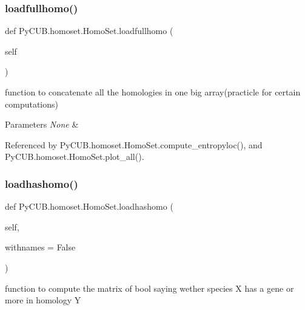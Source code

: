 \mbox{\label{class_py_c_u_b_1_1homoset_1_1_homo_set_a5029dbdf4e7f61bd38b6273f4fde9ead}} 
\subsubsection{\texorpdfstring{loadfullhomo()}{loadfullhomo()}}
{\footnotesize\ttfamily def Py\+C\+U\+B.\+homoset.\+Homo\+Set.\+loadfullhomo (\begin{DoxyParamCaption}\item[{}]{self }\end{DoxyParamCaption})}



function to concatenate all the homologies in one big array(practicle for certain computations) 


\begin{DoxyParams}{Parameters}
{\em None} & \\
\hline
\end{DoxyParams}


Referenced by Py\+C\+U\+B.\+homoset.\+Homo\+Set.\+compute\+\_\+entropyloc(), and Py\+C\+U\+B.\+homoset.\+Homo\+Set.\+plot\+\_\+all().

\mbox{\label{class_py_c_u_b_1_1homoset_1_1_homo_set_a5a56a99b5bf87afb418a1bbc5ec1c10b}} 
\subsubsection{\texorpdfstring{loadhashomo()}{loadhashomo()}}
{\footnotesize\ttfamily def Py\+C\+U\+B.\+homoset.\+Homo\+Set.\+loadhashomo (\begin{DoxyParamCaption}\item[{}]{self,  }\item[{}]{withnames = {\ttfamily False} }\end{DoxyParamCaption})}



function to compute the matrix of bool saying wether species X has a gene or more in homology Y 


